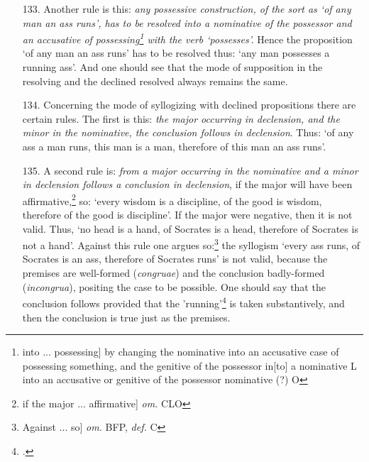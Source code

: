 \begin{itemize}
But if the declined precedes the nominative, then the nominative is held to be in the part of the predicate, and the declined in the part of the subject. For in saying `of any man an ass runs' `ass' is held in the part of the predicate, and `of man' is the subject of distribution, and so under man one should make the assumption, if one should syllogize from this proposition, so: `of any man an ass runs, this man is a man, therefore of this man an ass runs'. One should note that any declined can be the subject of distribution, but not any can be the subject of a locution grammatically\footnote{but ... grammatically] yet cannot be the subject or suppositum significatively LO} speaking, since a declined is not able to supposit with respect to a verb, since it is dependent on a nominative.
\item[133.] Another rule is this: \textit{any possessive construction, of the sort as `of any man an ass runs', has to be resolved into a nominative of the possessor and an accusative of possessing\footnote{into ... possessing] by changing the nominative into an accusative case of possessing something, and the genitive of the possessor in[to] a nominative L into an accusative or genitive of the possessor nominative (?) O} with the verb `possesses'.} Hence the proposition `of any man an ass runs' has to be resolved thus: `any man possesses a running ass'. And one should see that the mode of supposition in the resolving and the declined resolved always remains the same. 
\item[134.] Concerning the mode of syllogizing with declined propositions there are certain rules. The first is this: \textit{the major occurring in declension, and the minor in the nominative, the conclusion follows in declension}. Thus: `of any ass a man runs, this man is a man, therefore of this man an ass runs'. 
\item[135.] A second rule is: \textit{from a major occurring in the nominative and a minor in declension follows a conclusion in declension}, if the major will have been affirmative,\footnote{if the major ... affirmative] \textit{om.} CLO} so: `every wisdom is a discipline, of the good is wisdom, therefore of the good is discipline'. If the major were negative, then it is not valid. Thus, `no head is a hand, of Socrates is a head, therefore of Socrates is not a hand'. Against this rule one argues so:\footnote{Against ... so] \textit{om.} BFP, \textit{def.} C} the syllogism `every ass runs, of Socrates is an ass, therefore of Socrates runs' is not valid, because the premises are well-formed (\textit{congruae}) and the conclusion badly-formed (\textit{incongrua}), positing the case to be possible. One should say that the conclusion follows provided that the 'running'\footnote{\cite[III-1. 9, p. 386.44]{OckhamSL}.} is taken substantively, and then the conclusion is true just as the premises.

\end{itemize}
